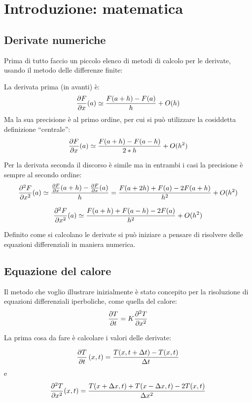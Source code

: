 \section{Introduzione: matematica}
\subsection{Derivate numeriche}
Prima di tutto faccio un piccolo elenco di metodi di calcolo per le derivate, usando il metodo delle differenze finite:

La derivata prima (in avanti) \`e:
\begin{equation}
  \frac{\partial F}{\partial x}(a) \simeq \frac{F(a+h)-F(a)}{h} + O(h)
\end{equation}
Ma la sua precisione \`e al primo ordine, per cui si pu\`o utilizzare la cosiddetta definizione ``centrale'':
\begin{equation}
  \frac{\partial F}{\partial x}(a) \simeq \frac{F(a+h)-F(a-h)}{2*h} + O(h^2)
\end{equation}

Per la derivata seconda il discorso \`e simile ma in entrambi i casi la precisione \`e sempre al secondo ordine:
\begin{equation}
  \frac{\partial ^2F}{\partial x^2}(a) \simeq \frac{\frac{\partial F}{\partial x}(a+h)-\frac{\partial F}{\partial x}(a)}{h} = \frac{F(a+2h)+F(a)-2F(a+h)}{h^2} + O(h^2)
\end{equation}

\begin{equation}
  \frac{\partial ^2F}{\partial x^2}(a) \simeq  \frac{F(a+h)+F(a-h)-2F(a)}{h^2} + O(h^2)
\end{equation}

Definito come si calcolano le derivate si pu\`o iniziare a pensare di risolvere delle equazioni differenziali in maniera numerica.

\subsection{Equazione del calore}
Il metodo che voglio illustrare inizialmente \`e stato concepito per la risoluzione di equazioni differenziali iperboliche, come quella del calore:
\begin{equation}\label{eq:calore}
  \frac{\partial T}{\partial t} =K \frac{\partial ^2T}{\partial x^2}
\end{equation}

La prima cosa da fare \`e calcolare i valori delle derivate:

\begin{equation}
  \frac{\partial T}{\partial t}\left( x,t \right) = \frac{T(x,t+\Delta t)-T(x,t)}{\Delta t}
\end{equation}
e
\begin{equation}
  \frac{\partial ^2T}{\partial x^2}(x,t) = \frac{T(x+\Delta x,t)+T(x-\Delta x,t)-2T(x,t)}{\Delta x^2}
\end{equation}
